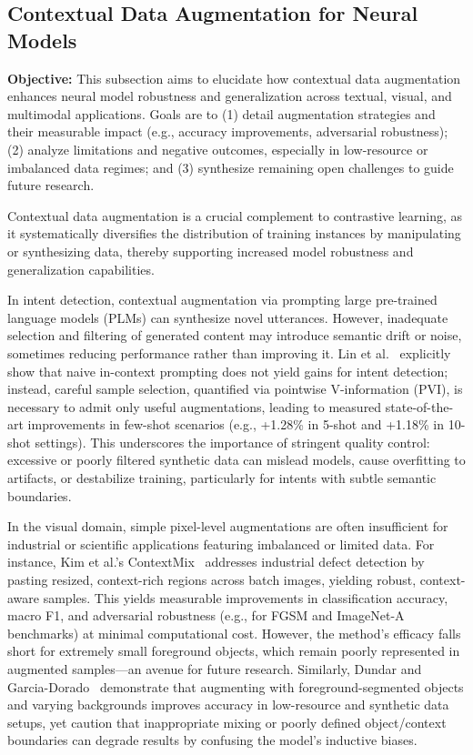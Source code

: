 \documentclass[sigconf]{acmart}
\begin{document}
\subsection{Contextual Data Augmentation for Neural Models}

\textbf{Objective:} This subsection aims to elucidate how contextual data augmentation enhances neural model robustness and generalization across textual, visual, and multimodal applications. Goals are to (1) detail augmentation strategies and their measurable impact (e.g., accuracy improvements, adversarial robustness); (2) analyze limitations and negative outcomes, especially in low-resource or imbalanced data regimes; and (3) synthesize remaining open challenges to guide future research.

Contextual data augmentation is a crucial complement to contrastive learning, as it systematically diversifies the distribution of training instances by manipulating or synthesizing data, thereby supporting increased model robustness and generalization capabilities.

In intent detection, contextual augmentation via prompting large pre-trained language models (PLMs) can synthesize novel utterances. However, inadequate selection and filtering of generated content may introduce semantic drift or noise, sometimes reducing performance rather than improving it. Lin et al.~\cite{ref61} explicitly show that naive in-context prompting does not yield gains for intent detection; instead, careful sample selection, quantified via pointwise V-information (PVI), is necessary to admit only useful augmentations, leading to measured state-of-the-art improvements in few-shot scenarios (e.g., +1.28\% in 5-shot and +1.18\% in 10-shot settings). This underscores the importance of stringent quality control: excessive or poorly filtered synthetic data can mislead models, cause overfitting to artifacts, or destabilize training, particularly for intents with subtle semantic boundaries.

In the visual domain, simple pixel-level augmentations are often insufficient for industrial or scientific applications featuring imbalanced or limited data. For instance, Kim et al.'s ContextMix~\cite{ref60} addresses industrial defect detection by pasting resized, context-rich regions across batch images, yielding robust, context-aware samples. This yields measurable improvements in classification accuracy, macro F1, and adversarial robustness (e.g., for FGSM and ImageNet-A benchmarks) at minimal computational cost. However, the method's efficacy falls short for extremely small foreground objects, which remain poorly represented in augmented samples—an avenue for future research. Similarly, Dundar and Garcia-Dorado~\cite{ref62} demonstrate that augmenting with foreground-segmented objects and varying backgrounds improves accuracy in low-resource and synthetic data setups, yet caution that inappropriate mixing or poorly defined object/context boundaries can degrade results by confusing the model's inductive biases.
\end{document}
